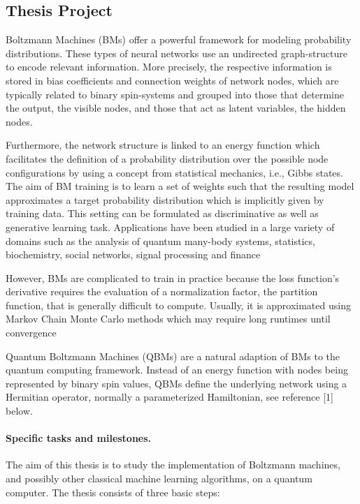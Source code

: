 \documentclass[%
oneside,                 %
final,                   %
10pt]{article}
\begin{document}
\subsection*{Thesis Project}

Boltzmann Machines (BMs) offer a powerful framework for modeling
probability distributions.  These types of neural networks use an
undirected graph-structure to encode relevant information.  More
precisely, the respective information is stored in bias coefficients
and connection weights of network nodes, which are typically related
to binary spin-systems and grouped into those that determine the
output, the visible nodes, and those that act as latent variables, the
hidden nodes.

Furthermore, the network structure is linked to an energy function
which facilitates the definition of a probability distribution over
the possible node configurations by using a concept from statistical
mechanics, i.e., Gibbs states.  The aim of BM training is to learn a
set of weights such that the resulting model approximates a target
probability distribution which is implicitly given by training data.
This setting can be formulated as discriminative as well as generative
learning task.  Applications have been studied in a large variety of
domains such as the analysis of quantum many-body systems, statistics,
biochemistry, social networks, signal processing and finance


However, BMs are complicated to train in practice because the loss
function's derivative requires the evaluation of a normalization
factor, the partition function, that is generally difficult to
compute.  Usually, it is approximated using Markov Chain Monte Carlo
methods which may require long runtimes until convergence

Quantum Boltzmann Machines (QBMs) are a natural adaption of BMs to the
quantum computing framework. Instead of an energy function with nodes
being represented by binary spin values, QBMs define the underlying
network using a Hermitian operator, normally a parameterized Hamiltonian, see reference [1] below.

\paragraph{Specific tasks and milestones.}
The aim of this thesis is to study the implementation of Boltzmann machines, and possibly other classical machine learning algorithms, on a quantum computer. The thesis consists of three basic steps:
\end{document}
